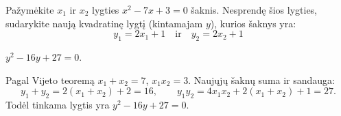 \begin{salyga}
Pažymėkite $x_1$ ir $x_2$ lygties $x^2 - 7x + 3 = 0$ šaknis. Nesprendę šios lygties, sudarykite naują kvadratinę lygtį (kintamajam $y$), kurios šaknys yra:
    \[ y_1 = 2x_1 + 1 \quad \text{ir} \quad y_2 = 2x_2 + 1 \]
\end{salyga}

\begin{atsakymas}
$y^2-16y+27=0$.
\end{atsakymas}

\begin{sprendimas}
Pagal Vijeto teoremą $x_1+x_2=7$, $x_1x_2=3$. Naujųjų šaknų suma ir sandauga:
\[
y_1+y_2=2(x_1+x_2)+2=16,\qquad
y_1y_2=4x_1x_2+2(x_1+x_2)+1=27.
\]
Todėl tinkama lygtis yra $y^2-16y+27=0$.
\end{sprendimas}
